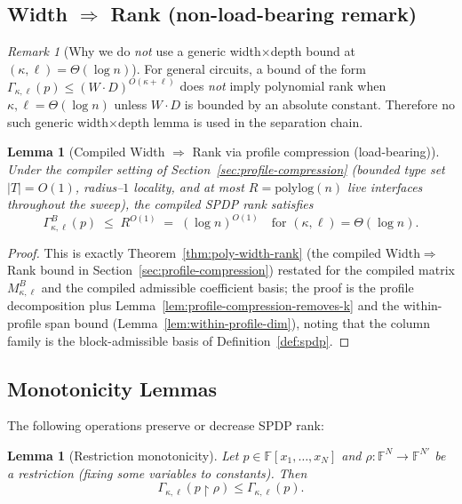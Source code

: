 \documentclass[12pt]{article}
\newtheorem{lemma}[theorem]{Lemma}
\theoremstyle{definition}
\theoremstyle{definition}
\theoremstyle{remark}
\newtheorem{remark}{Remark}
\theoremstyle{remark}
\begin{document}

\subsection{Width $\Rightarrow$ Rank (non-load-bearing remark)}
\label{sec:width-to-rank}
\label{subsec:G4-width-rank}

\begin{remark}[Why we do \emph{not} use a generic width$\times$depth bound at $(\kappa,\ell)=\Theta(\log n)$]
For general circuits, a bound of the form
$\Gamma_{\kappa,\ell}(p)\le (W\cdot D)^{O(\kappa+\ell)}$
does \emph{not} imply polynomial rank when $\kappa,\ell=\Theta(\log n)$ unless $W\cdot D$
is bounded by an absolute constant.  Therefore no such generic width$\times$depth lemma is
used in the separation chain.
\end{remark}

\begin{lemma}[Compiled Width $\Rightarrow$ Rank via profile compression (load-bearing)]
\label{thm:compiled-width-rank}
\label{lem:width-to-rank-formal}
Under the compiler setting of Section~\ref{sec:profile-compression}
(bounded type set $|T|=O(1)$, radius--$1$ locality, and at most $R=\mathrm{polylog}(n)$ live
interfaces throughout the sweep), the compiled SPDP rank satisfies
\[
\Gamma^{B}_{\kappa,\ell}(p)\;\le\; R^{O(1)}\;=\;(\log n)^{O(1)}
\quad\text{for }(\kappa,\ell)=\Theta(\log n).
\]
\end{lemma}

\begin{proof}
This is exactly Theorem~\ref{thm:poly-width-rank} (the compiled Width$\Rightarrow$Rank bound
in Section~\ref{sec:profile-compression})
restated for the compiled matrix $M^{B}_{\kappa,\ell}$ and the compiled admissible coefficient
basis; the proof is the profile decomposition plus Lemma~\ref{lem:profile-compression-removes-k} and the
within-profile span bound (Lemma~\ref{lem:within-profile-dim}), noting that the column family is the block-admissible
basis of Definition~\ref{def:spdp}.
\end{proof}

\subsection{Monotonicity Lemmas}

The following operations preserve or decrease SPDP rank:

\begin{lemma}[Restriction monotonicity]\label{lem:restriction-monotonicity}
Let $p \in \mathbb{F}[x_1, \ldots, x_N]$ and $\rho : \mathbb{F}^N \to \mathbb{F}^{N'}$ be a restriction (fixing some variables to constants). Then
\[
\Gamma_{\kappa,\ell}(p \!\upharpoonright\! \rho) \leq \Gamma_{\kappa,\ell}(p).
\]
\end{lemma}
\end{document}
